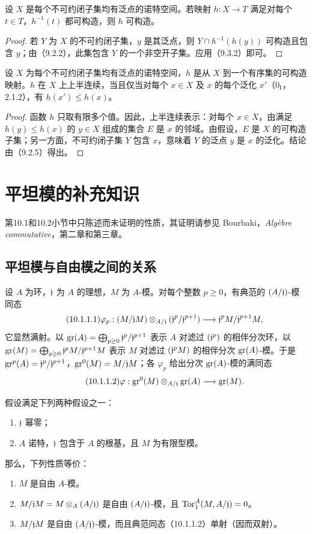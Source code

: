 设 $X$ 是每个不可约闭子集均有泛点的诺特空间。若映射 $h:X\to T$ 满足对每个 $t\in T$，$h^{-1}(t)$ 都可构造，则 $h$ 可构造。
\begin{proof}
若 $Y$ 为 $X$ 的不可约闭子集，$y$ 是其泛点，则 $Y\cap h^{-1}(h(y))$ 可构造且包含 $y$；由（9.2.2），此集包含 $Y$ 的一个非空开子集。应用（9.3.2）即可。
\end{proof}

设 $X$ 为每个不可约闭子集均有泛点的诺特空间，$h$ 是从 $X$ 到一个有序集的可构造映射。$h$ 在 $X$ 上上半连续，当且仅当对每个 $x\in X$ 及 $x$ 的每个泛化 $x'$（$0_{\mathrm I}$，2.1.2），有 $h(x')\leq h(x)$。
\begin{proof}
函数 $h$ 只取有限多个值。因此，上半连续表示：对每个 $x\in X$，由满足 $h(y)\leq h(x)$ 的 $y\in X$ 组成的集合 $E$ 是 $x$ 的邻域。由假设，$E$ 是 $X$ 的可构造子集；另一方面，不可约闭子集 $Y$ 包含 $x$，意味着 $Y$ 的泛点 $y$ 是 $x$ 的泛化。结论由（9.2.5）得出。
\end{proof}\par

\section{平坦模的补充知识}
第10.1和10.2小节中只陈述而未证明的性质，其证明请参见 Bourbaki，\textit{Algèbre commutative}，第二章和第三章。
\subsection{平坦模与自由模之间的关系}
设 $A$ 为环，$\mathfrak j$ 为 $A$ 的理想，$M$ 为 $A$-模。对每个整数 $p\geq0$，有典范的 $(A/\mathfrak j)$-模同态
\begin{equation}\tag{10.1.1.1}
\varphi_p:(M/\mathfrak j M)\otimes_{A/\mathfrak j}(\mathfrak j^p/\mathfrak j^{p+1})\longrightarrow\mathfrak j^pM/\mathfrak j^{p+1}M,
\end{equation}
它显然满射。以 $\operatorname{gr}(A)=\bigoplus_{p\geq0}\mathfrak j^p/\mathfrak j^{p+1}$ 表示 $A$ 对滤过 $(\mathfrak j^p)$ 的相伴分次环，以 $\operatorname{gr}(M)=\bigoplus_{p\geq0}\mathfrak j^pM/\mathfrak j^{p+1}M$ 表示 $M$ 对滤过 $(\mathfrak j^pM)$ 的相伴分次 $\operatorname{gr}(A)$-模。于是 $\operatorname{gr}^p(A)=\mathfrak j^p/\mathfrak j^{p+1}$，$\operatorname{gr}^0(M)=M/\mathfrak j M$；各 $\varphi_p$ 给出分次 $\operatorname{gr}(A)$-模的满同态
\begin{equation}\tag{10.1.1.2}
\varphi:\operatorname{gr}^0(M)\otimes_{A/\mathfrak j}\operatorname{gr}(A)\longrightarrow\operatorname{gr}(M).
\end{equation}

假设满足下列两种假设之一：
\begin{enumerate}[label=(\roman*)]
\item $\mathfrak j$ 幂零；
\item $A$ 诺特，$\mathfrak j$ 包含于 $A$ 的根基，且 $M$ 为有限型模。
\end{enumerate}
那么，下列性质等价：
\begin{enumerate}[label=\alph*)]
\item $M$ 是自由 $A$-模。
\item $M/\mathfrak j M=M\otimes_A(A/\mathfrak j)$ 是自由 $(A/\mathfrak j)$-模，且 $\operatorname{Tor}_1^A(M,A/\mathfrak j)=0$。
\item $M/\mathfrak j M$ 是自由 $(A/\mathfrak j)$-模，而且典范同态（10.1.1.2）单射（因而双射）。
\end{enumerate}

